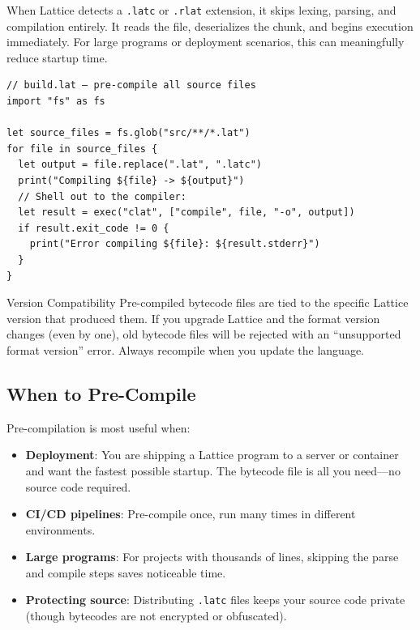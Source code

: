 When Lattice detects a \lstinline|.latc| or \lstinline|.rlat| extension, it skips lexing, parsing, and compilation entirely. It reads the file, deserializes the chunk, and begins execution immediately. For large programs or deployment scenarios, this can meaningfully reduce startup time.

\begin{lstlisting}[language=Lattice, caption={A build script that pre-compiles a project}]
// build.lat — pre-compile all source files
import "fs" as fs

let source_files = fs.glob("src/**/*.lat")
for file in source_files {
  let output = file.replace(".lat", ".latc")
  print("Compiling ${file} -> ${output}")
  // Shell out to the compiler:
  let result = exec("clat", ["compile", file, "-o", output])
  if result.exit_code != 0 {
    print("Error compiling ${file}: ${result.stderr}")
  }
}
\end{lstlisting}

\begin{warnbox}{Version Compatibility}
Pre-compiled bytecode files are tied to the specific Lattice version that produced them. If you upgrade Lattice and the format version changes (even by one), old bytecode files will be rejected with an ``unsupported format version'' error. Always recompile when you update the language.
\end{warnbox}

\subsection{When to Pre-Compile}

Pre-compilation is most useful when:

\begin{itemize}
  \item \textbf{Deployment}: You are shipping a Lattice program to a server or container and want the fastest possible startup. The bytecode file is all you need---no source code required.
  \item \textbf{CI/CD pipelines}: Pre-compile once, run many times in different environments.
  \item \textbf{Large programs}: For projects with thousands of lines, skipping the parse and compile steps saves noticeable time.
  \item \textbf{Protecting source}: Distributing \lstinline|.latc| files keeps your source code private (though bytecodes are not encrypted or obfuscated).
\end{itemize}

